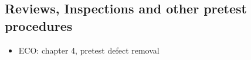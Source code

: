
 \subsection{Reviews, Inspections and other pretest procedures}
 
 \begin{itemize}
  
 \item ECO: chapter 4, pretest defect removal
 
 \end{itemize}
 